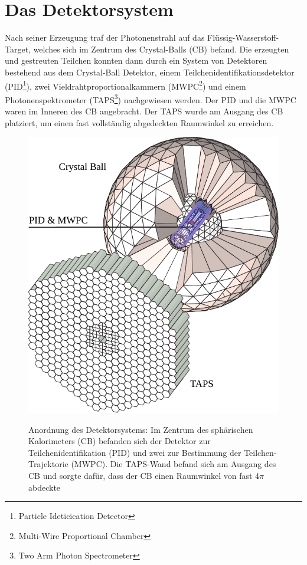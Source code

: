 \documentclass[a4paper,11pt,oneside,final,german,openbib,pdftex]{scrbook}
\begin{document}
\section{Das Detektorsystem}
Nach seiner Erzeugung traf der Photonenstrahl auf das Flüssig-Wasserstoff-Target, welches sich im Zentrum des Crystal-Balls (CB) befand. Die erzeugten und gestreuten Teilchen konnten dann durch ein System von Detektoren bestehend aus dem Crystal-Ball Detektor, einem Teilchenidentifikationsdetektor (PID\footnote{Particle Ideticication Detector}), zwei Vieldrahtproportionalkammern (MWPC\footnote{Multi-Wire Proportional Chamber}) und einem Photonenspektrometer (TAPS\footnote{Two Arm  Photon Spectrometer}) nachgewiesen werden. Der PID und die MWPC waren im Inneren des CB angebracht. Der TAPS wurde am Ausgang des CB platziert, um einen fast vollständig abgedeckten Raumwinkel zu erreichen.
\begin{figure}[h]
	\begin{center}
		\includegraphics{crystal_ball}
		\label{[fig.crystal_ball]}
		\caption{Anordnung des Detektorsystems: Im Zentrum des sph\"arischen Kalorimeters (CB) befanden sich der Detektor zur Teilchenidentifikation (PID) und zwei zur Bestimmung der Teilchen-Trajektorie (MWPC). Die TAPS-Wand befand sich am Ausgang des CB und sorgte daf\"ur, dass der CB einen Raumwinkel von fast 4$\pi$ abdeckte\cite{We13}}
	\end{center}
\end{figure}
\end{document}
